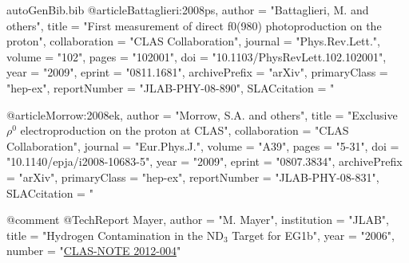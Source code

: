 \begin{filecontents*}{autoGenBib.bib}
@article{Battaglieri:2008ps,
      author         = "Battaglieri, M. and others",
      title          = "{First measurement of direct f0(980) photoproduction on
                        the proton}",
      collaboration  = "CLAS Collaboration",
      journal        = "Phys.Rev.Lett.",
      volume         = "102",
      pages          = "102001",
      doi            = "10.1103/PhysRevLett.102.102001",
      year           = "2009",
      eprint         = "0811.1681",
      archivePrefix  = "arXiv",
      primaryClass   = "hep-ex",
      reportNumber   = "JLAB-PHY-08-890",
      SLACcitation   = "%
}

@article{Morrow:2008ek,
      author         = "Morrow, S.A. and others",
      title          = "{Exclusive $\rho^0$ electroproduction on the proton at CLAS}",
      collaboration  = "CLAS Collaboration",
      journal        = "Eur.Phys.J.",
      volume         = "A39",
      pages          = "5-31",
      doi            = "10.1140/epja/i2008-10683-5",
      year           = "2009",
      eprint         = "0807.3834",
      archivePrefix  = "arXiv",
      primaryClass   = "hep-ex",
      reportNumber   = "JLAB-PHY-08-831",
      SLACcitation   = "%
}






@comment %
@TechReport{ Mayer,
	author = "M. Mayer",
	institution = "JLAB",
	title = "{Hydrogen Contamination in the ND$_3$ Target for EG1b}",
	year = "2006",
	number = "\href{https://misportal.jlab.org/ul/Physics/Hall-B/clas/index.cfm?note\_year=2012}{CLAS-NOTE 2012-004}"
}
\end{filecontents*}

